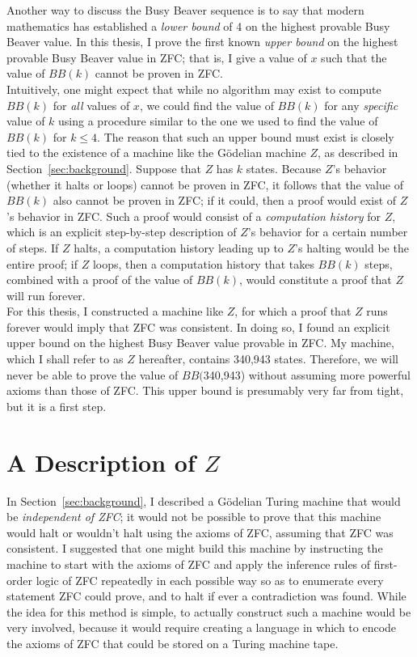 \documentclass[11pt]{report}
\newcommand{\statenum}{340,943 }
\newcommand{\bbstatenum}{$BB($340,943) }
\begin{document}
Another way to discuss the Busy Beaver sequence is to say that modern mathematics has established a \emph{lower bound} of 4 on the highest provable Busy Beaver value. In this thesis, I prove the first known \emph{upper bound} on the highest provable Busy Beaver value in ZFC; that is, I give a value of $x$ such that the value of $BB(k)$ cannot be proven in ZFC. \\

Intuitively, one might expect that while no algorithm may exist to compute $BB(k)$ for \emph{all} values of $x$, we could find the value of $BB(k)$ for any \emph{specific} value of $k$ using a procedure similar to the one we used to find the value of $BB(k)$ for $k \le 4$. The reason that such an upper bound must exist is closely tied to the existence of a machine like the G\"{o}delian machine $Z$, as described in Section~\ref{sec:background}. Suppose that $Z$ has $k$ states. Because $Z$'s behavior (whether it halts or loops) cannot be proven in ZFC, it follows that the value of $BB(k)$ also cannot be proven in ZFC; if it could, then a proof would exist of $Z$'s behavior in ZFC. Such a proof would consist of a \emph{computation history} for $Z$, which is an explicit step-by-step description of $Z$'s behavior for a certain number of steps. If $Z$ halts, a computation history leading up to $Z$'s halting would be the entire proof; if $Z$ loops, then a computation history that takes $BB(k)$ steps, combined with a proof of the value of $BB(k)$, would constitute a proof that $Z$ will run forever. \\

For this thesis, I constructed a machine like $Z$, for which a proof that $Z$ runs forever would imply that ZFC was consistent. In doing so, I found an explicit upper bound on the highest Busy Beaver value provable in ZFC. My machine, which I shall refer to as $Z$ hereafter, contains \statenum states. Therefore, we will never be able to prove the value of \bbstatenum without assuming more powerful axioms than those of ZFC. This upper bound is presumably very far from tight, but it is a first step.

\section{A Description of $Z$}

In Section~\ref{sec:background}, I described a G\"{o}delian Turing machine that would be \emph{independent of ZFC}; it would not be possible to prove that this machine would halt or wouldn't halt using the axioms of ZFC, assuming that ZFC was consistent. I suggested that one might build this machine by instructing the machine to start with the axioms of ZFC and apply the inference rules of first-order logic of ZFC repeatedly in each possible way so as to enumerate every statement ZFC could prove, and to halt if ever a contradiction was found. While the idea for this method is simple, to actually construct such a machine would be very involved, because it would require creating a language in which to encode the axioms of ZFC that could be stored on a Turing machine tape. \\
\end{document}
